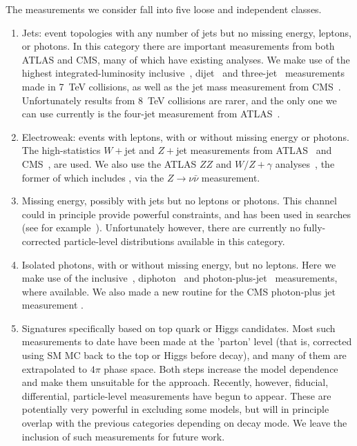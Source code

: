 \documentclass[floatfix]{article}
\begin{document}
The measurements we consider fall into five loose and independent classes.
\begin{enumerate}
\item
Jets: event topologies with any number of jets but no missing energy, leptons, or photons. In this category there
are important measurements from both ATLAS and CMS, many of which have existing \rivet analyses. We make use of 
the highest integrated-luminosity inclusive~\cite{Aad:2014vwa,Chatrchyan:2014gia}, dijet~\cite{Aad:2013tea,Aad:2014pua} 
and three-jet~\cite{Aad:2014rma} 
measurements made in 7~TeV collisions, as well as the jet mass 
measurement from CMS~\cite{Chatrchyan:2013vbb}.
Unfortunately results from 8~TeV collisions are rarer, and the only one we can use currently is the four-jet 
measurement from ATLAS~\cite{Aad:2015nda}.
\item
Electroweak: events with leptons, with or without missing energy or photons. The high-statistics $W+$jet and $Z+$jet measurements 
from ATLAS~\cite{Aad:2014qxa,Aad:2013ysa} 
and CMS~\cite{Khachatryan:2014uva,Khachatryan:2014zya}, are used.
We also use the ATLAS $ZZ$ and $W/Z+\gamma$ analyses~\cite{Aad:2012awa,Aad:2013izg}, the former of which includes \MET, 
via the $Z \rightarrow \nu\bar{\nu}$ measurement.
\item
Missing energy, possibly with jets but no leptons or photons. This channel could in principle provide powerful constraints, and has been 
used in searches (see for example~\cite{Aad:2012fqa}). Unfortunately however, there are currently no fully-corrected particle-level 
distributions available in this category. 
\item
Isolated photons, with or without missing energy, but no leptons. Here we make use of the inclusive~\cite{Aad:2013zba}, diphoton~\cite{Aad:2012tba} and 
photon-plus-jet~\cite{ATLAS:2012ar} measurements,
where available. We also made a new \rivet routine for the CMS photon-plus jet measurement \cite{Chatrchyan:2013mwa}. 
\item
Signatures specifically based on top quark or Higgs candidates. Most such measurements to date have been made at the 'parton' level (that is,
corrected using SM MC back to the top or Higgs before decay), and many of them are extrapolated to $4\pi$ phase space. Both steps increase
the model dependence and make them unsuitable for the \Contur approach. Recently, however, fiducial, differential, particle-level measurements
have begun to appear\cite{Aad:2015hna,Khachatryan:2016gxp}. These are potentially very powerful in excluding some models, but will in principle 
overlap with the previous 
categories depending on decay mode. We leave the inclusion of such measurements for future work.
\end{enumerate}
\end{document}
